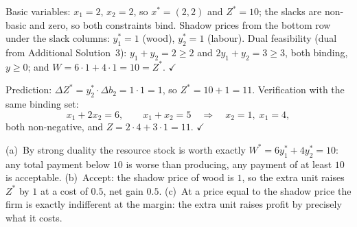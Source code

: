 \begin{solutions}
  \item Basic variables: $x_{1}=2$, $x_{2}=2$, so $x^{*}=(2,2)$ and
        $Z^{*}=10$; the slacks are non-basic and zero, so both
        constraints bind. Shadow prices from the bottom row under the
        slack columns: $y_{1}^{*}=1$ (wood), $y_{2}^{*}=1$ (labour).
        Dual feasibility (dual from Additional Solution~3):
        $y_{1}+y_{2}=2\ge 2$ and $2y_{1}+y_{2}=3\ge 3$, both binding,
        $y\ge 0$; and $W=6\cdot 1+4\cdot 1=10=Z^{*}$. $\checkmark$

  \item Prediction: $\Delta Z^{*}=y_{2}^{*}\cdot\Delta b_{2}=1\cdot 1=1$,
        so $Z^{*}=10+1=11$. Verification with the same binding set:
        \[
          x_{1}+2x_{2}=6,\qquad x_{1}+x_{2}=5
          \quad\Longrightarrow\quad x_{2}=1,\; x_{1}=4 ,
        \]
        both non-negative, and $Z=2\cdot 4+3\cdot 1=11$. $\checkmark$

  \item (a)~By strong duality the resource stock is worth exactly
        $W^{*}=6y_{1}^{*}+4y_{2}^{*}=10$: any total payment below $10$
        is worse than producing, any payment of at least $10$ is
        acceptable.
        (b)~Accept: the shadow price of wood is $1$, so the extra unit
        raises $Z^{*}$ by $1$ at a cost of $0.5$, net gain $0.5$.
        (c)~At a price equal to the shadow price the firm is exactly
        indifferent at the margin: the extra unit raises profit by
        precisely what it costs.


\end{solutions}
